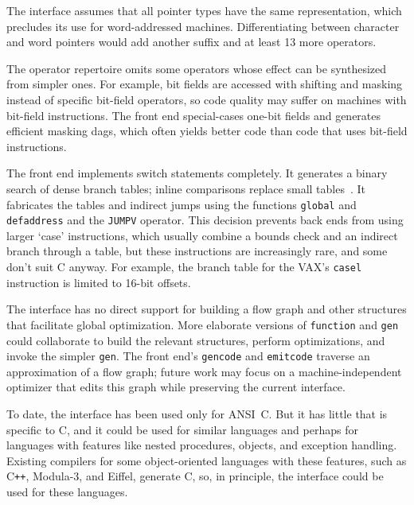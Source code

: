 The interface assumes that all pointer types have the same representation,
which precludes its use for word-addressed machines.
Differentiating between character and word pointers
would add another suffix and at least 13 more operators.

The operator repertoire omits some operators whose effect
can be synthesized from simpler ones.
For example, bit fields are accessed with shifting
and masking instead of specific bit-field operators, so
code quality may suffer on machines with bit-field instructions.
The front end special-cases one-bit fields
and generates efficient masking dags,
which often yields better code than code
that uses bit-field instructions.

The front end implements switch statements completely.
It generates a binary search of dense branch tables;
inline comparisons replace small tables~\cite{bernstein85}.
It fabricates the tables and indirect jumps
using the functions \verb|global| and \verb|defaddress|
and the \verb|JUMPV| operator.
This decision prevents back ends from using larger `case' instructions,
which usually combine a bounds check and an indirect branch through a table,
but these instructions are increasingly rare, and some don't suit C anyway.
For example, the branch table for the VAX's \verb|casel| instruction is limited
to 16-bit offsets.

The interface has no direct support for building
a flow graph and other structures that facilitate
global optimization. More elaborate versions of
\verb|function| and \verb|gen| could collaborate
to build the relevant structures, perform optimizations,
and invoke the simpler \verb|gen|.
The front end's \verb|gencode| and \verb|emitcode| traverse
an approximation of a flow graph; future work may focus on
a machine-independent optimizer that edits
this graph while preserving the current interface.

To date, the interface has been used only for ANSI~C.
But it has little that is specific to C, and it could be used for
similar languages and perhaps for languages with features like nested
procedures, objects, and exception handling.
Existing compilers for some object-oriented languages with these features,
such as C\verb|++|, Modula-3, and Eiffel, generate C, so, in principle,
the interface could be used for these languages.

